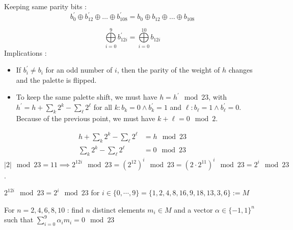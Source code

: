 \documentclass{article}
\begin{document}
Keeping same parity bits :
$$b^\prime_0 \oplus b^\prime_{12} \oplus \dots \oplus b^\prime _{108} = b_0  \oplus b_{12} \oplus \dots \oplus b_{108}$$

$$\bigoplus\limits_{i=0}^{9} b^\prime_{12i} = \bigoplus\limits_{i=0}^{10} b_{12i}$$
Implications :
\begin{itemize}
	\item If $b^\prime_i \neq b_i$ for an odd number of $i$, then the parity of the weight of $h$ changes and the palette is flipped.
	\item To keep the same palette shift, we must have $h = h^\prime \mod 23$, with $h^\prime = h + \sum\limits_k 2^k - \sum\limits_\ell 2^\ell$ for all $k : b_k = 0 \wedge b^\prime_k = 1$ and $\ell : b_\ell = 1 \wedge b^\prime_\ell = 0$. Because of the previous point, we must have $k + \ell = 0 \mod 2$.
\end{itemize}

\begin{align*}
	 h + \sum\limits_k 2^k - \sum\limits_\ell 2^\ell &= h \mod 23\\
	\sum\limits_k 2^k - \sum\limits_\ell 2^\ell &= 0 \mod 23
\end{align*}
$|2| \mod 23 = 11 \implies 2^{12i} \mod 23 = \left(2^{12}\right)^i \mod 23= \left( 2 \cdot 2^{11} \right)^i \mod 23= 2^i \mod 23$.

$2^{12i} \mod 23 = 2^i \mod 23$ for $i \in \{0, \cdots, 9\} = \{1, 2, 4, 8, 16, 9, 18, 13, 3, 6\} := M$

For $n = 2,4,6,8,10$ : find $n$ distinct elements $m_i \in M$ and a vector $\alpha \in \{-1, 1\}^n$ such that $\sum\limits_{i = 0}^9 \alpha_i m_i = 0 \mod 23$
\end{document}
